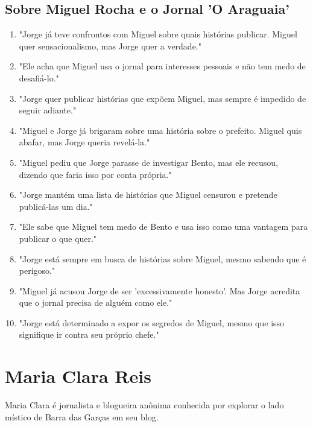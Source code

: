 \subsection*{Sobre Miguel Rocha e o Jornal 'O Araguaia'}
\begin{enumerate}
    \item "Jorge já teve confrontos com Miguel sobre quais histórias publicar. Miguel quer sensacionalismo, mas Jorge quer a verdade."
    \item "Ele acha que Miguel usa o jornal para interesses pessoais e não tem medo de desafiá-lo."
    \item "Jorge quer publicar histórias que expõem Miguel, mas sempre é impedido de seguir adiante."
    \item "Miguel e Jorge já brigaram sobre uma história sobre o prefeito. Miguel quis abafar, mas Jorge queria revelá-la."
    \item "Miguel pediu que Jorge parasse de investigar Bento, mas ele recusou, dizendo que faria isso por conta própria."
    \item "Jorge mantém uma lista de histórias que Miguel censurou e pretende publicá-las um dia."
    \item "Ele sabe que Miguel tem medo de Bento e usa isso como uma vantagem para publicar o que quer."
    \item "Jorge está sempre em busca de histórias sobre Miguel, mesmo sabendo que é perigoso."
    \item "Miguel já acusou Jorge de ser 'excessivamente honesto'. Mas Jorge acredita que o jornal precisa de alguém como ele."
    \item "Jorge está determinado a expor os segredos de Miguel, mesmo que isso signifique ir contra seu próprio chefe."
\end{enumerate}

\section{Maria Clara Reis}
Maria Clara é jornalista e blogueira anônima conhecida por explorar o lado místico de Barra das Garças em seu blog.

